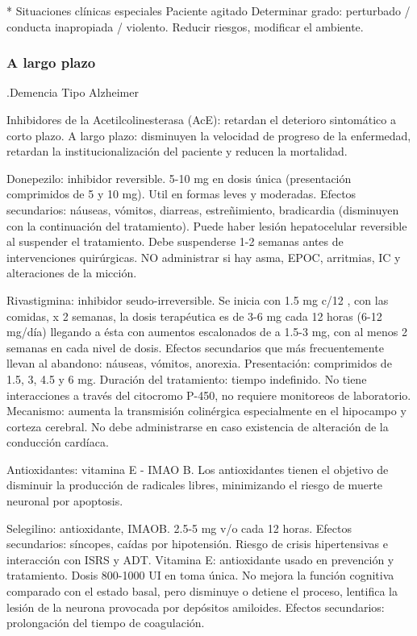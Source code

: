 * Situaciones clínicas especiales Paciente agitado Determinar grado: perturbado / conducta inapropiada / violento. Reducir riesgos, modificar el ambiente.

\subsubsection*{A largo plazo}

.Demencia Tipo Alzheimer

Inhibidores de la Acetilcolinesterasa (AcE): retardan el deterioro sintomático a corto plazo. A largo plazo: disminuyen la velocidad de progreso de la enfermedad, retardan la institucionalización del paciente y reducen la mortalidad.

Donepezilo: inhibidor reversible. 5-10 mg en dosis única (presentación comprimidos de 5 y 10 mg). Util en formas leves y moderadas. Efectos secundarios: náuseas, vómitos, diarreas, estreñimiento, bradicardia (disminuyen con la continuación del tratamiento). Puede haber lesión hepatocelular reversible al suspender el tratamiento. Debe suspenderse 1-2 semanas antes de intervenciones quirúrgicas. NO administrar si hay asma, EPOC, arritmias, IC y alteraciones de la micción.

Rivastigmina: inhibidor seudo-irreversible. Se inicia con 1.5 mg c/12 , con las comidas, x 2 semanas, la dosis terapéutica es de 3-6 mg cada 12 horas (6-12 mg/día) llegando a ésta con aumentos escalonados de a 1.5-3 mg, con al menos 2 semanas en cada nivel de dosis. Efectos secundarios que más frecuentemente llevan al abandono: náuseas, vómitos, anorexia. Presentación: comprimidos de 1.5, 3, 4.5 y 6 mg. Duración del tratamiento: tiempo indefinido. No tiene interacciones a través del citocromo P-450, no requiere monitoreos de laboratorio. Mecanismo: aumenta la transmisión colinérgica especialmente en el hipocampo y corteza cerebral. No debe administrarse en caso existencia de alteración de la conducción cardíaca.

Antioxidantes: vitamina E - IMAO B. Los antioxidantes tienen el objetivo de disminuir la producción de radicales libres, minimizando el riesgo de muerte neuronal por apoptosis.

Selegilino: antioxidante, IMAOB. 2.5-5 mg v/o cada 12 horas. Efectos secundarios: síncopes, caídas por hipotensión. Riesgo de crisis hipertensivas e interacción con ISRS y ADT. Vitamina E: antioxidante usado en prevención y tratamiento. Dosis 800-1000 UI en toma única. No mejora la función cognitiva comparado con el estado basal, pero disminuye o detiene el proceso, lentifica la lesión de la neurona provocada por depósitos amiloides. Efectos secundarios: prolongación del tiempo de coagulación.

